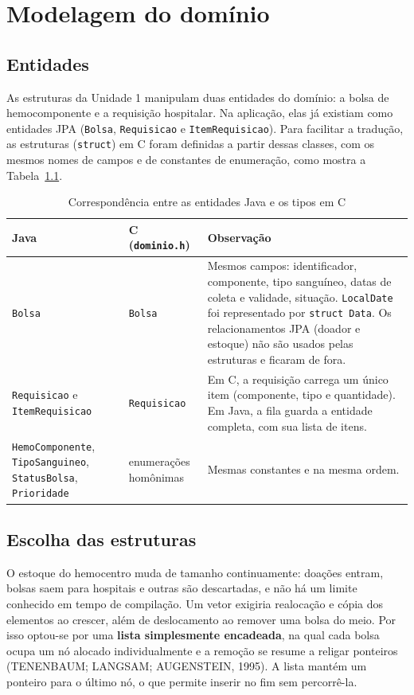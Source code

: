 \documentclass[12pt,a4paper,oneside]{report}
\newcommand{\fonte}[1][Elaborado pelos autores (2026).]{\par\vspace{2pt}{\centering\small Fonte: #1\par}\vspace{6pt}}
\newcommand{\cod}[1]{\texttt{#1}}
\begin{document}
\chapter{Modelagem do domínio}

\section{Entidades}

As estruturas da Unidade 1 manipulam duas entidades do domínio: a bolsa de hemocomponente e a requisição hospitalar. Na aplicação, elas já existiam como entidades JPA (\cod{Bolsa}, \cod{Requisicao} e \cod{ItemRequisicao}). Para facilitar a tradução, as estruturas (\cod{struct}) em C foram definidas a partir dessas classes, com os mesmos nomes de campos e de constantes de enumeração, como mostra a Tabela~\ref{tab:entidades}.

\begin{table}[H]
\caption{Correspondência entre as entidades Java e os tipos em C}
\label{tab:entidades}
\small
\begin{tabularx}{\textwidth}{@{}p{3.6cm}p{3.4cm}X@{}}
\toprule
\textbf{Java} & \textbf{C (\cod{dominio.h})} & \textbf{Observação} \\
\midrule
\cod{Bolsa} & \cod{Bolsa} & Mesmos campos: identificador, componente, tipo sanguíneo, datas de coleta e validade, situação. \cod{LocalDate} foi representado por \cod{struct Data}. Os relacionamentos JPA (doador e estoque) não são usados pelas estruturas e ficaram de fora. \\
\cod{Requisicao} e \cod{ItemRequisicao} & \cod{Requisicao} & Em C, a requisição carrega um único item (componente, tipo e quantidade). Em Java, a fila guarda a entidade completa, com sua lista de itens. \\
\cod{HemoComponente}, \cod{TipoSanguineo}, \cod{StatusBolsa}, \cod{Prioridade} & enumerações homônimas & Mesmas constantes e na mesma ordem. \\
\bottomrule
\end{tabularx}
\fonte
\end{table}

\section{Escolha das estruturas}

O estoque do hemocentro muda de tamanho continuamente: doações entram, bolsas saem para hospitais e outras são descartadas, e não há um limite conhecido em tempo de compilação. Um vetor exigiria realocação e cópia dos elementos ao crescer, além de deslocamento ao remover uma bolsa do meio. Por isso optou-se por uma \textbf{lista simplesmente encadeada}, na qual cada bolsa ocupa um nó alocado individualmente e a remoção se resume a religar ponteiros (TENENBAUM; LANGSAM; AUGENSTEIN, 1995). A lista mantém um ponteiro para o último nó, o que permite inserir no fim sem percorrê-la.
\end{document}
